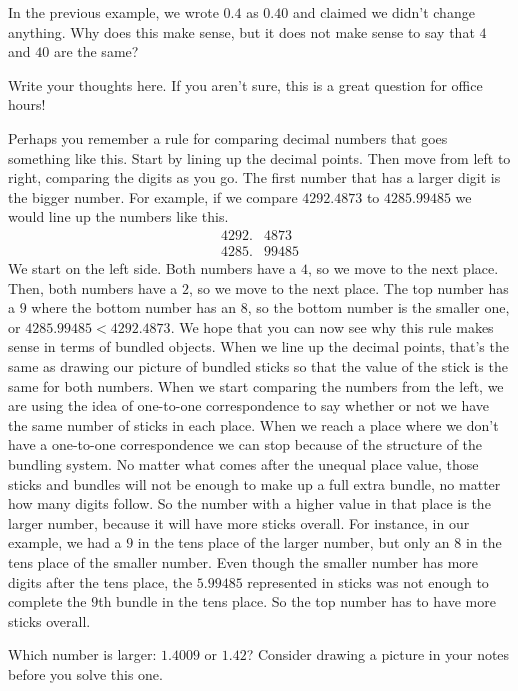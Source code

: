 \documentclass{ximera}
\begin{document}
\begin{question}
In the previous example, we wrote $0.4$ as $0.40$ and claimed we didn't change anything. Why does this make sense, but it does not make sense to say that $4$ and $40$ are the same?
\begin{freeResponse}
Write your thoughts here. If you aren't sure, this is a great question for office hours!
\end{freeResponse}
\end{question}

Perhaps you remember a rule for comparing decimal numbers that goes something like this. Start by lining up the decimal points. Then move from left to right, comparing the digits as you go. The first number that has a larger digit is the bigger number. For example, if we compare $4292.4873$ to $4285.99485$ we would line up the numbers like this.
\begin{align*}
4292.&4873\\
4285.&99485
\end{align*}
We start on the left side. Both numbers have a $4$, so we move to the next place. Then, both numbers have a $2$, so we move to the next place. The top number has a $9$ where the bottom number has an $8$, so the bottom number is the smaller one, or $4285.99485 < 4292.4873$. We hope that you can now see why this rule makes sense in terms of bundled objects. When we line up the decimal points, that's the same as drawing our picture of bundled sticks so that the value of the stick is the same for both numbers. When we start comparing the numbers from the left, we are using the idea of one-to-one correspondence to say whether or not we have the same number of sticks in each place. When we reach a place where we don't have a one-to-one correspondence we can stop because of the structure of the bundling system. No matter what comes after the unequal place value, those sticks and bundles will not be enough to make up a full extra bundle, no matter how many digits follow. So the number with a higher value in that place is the larger number, because it will have more sticks overall. For instance, in our example, we had a $9$ in the tens place of the larger number, but only an $8$ in the tens place of the smaller number. Even though the smaller number has more digits after the tens place, the $5.99485$ represented in sticks was not enough to complete the $9$th bundle in the tens place. So the top number has to have more sticks overall.

\begin{question}
Which number is larger: $1.4009$ or $1.42$? Consider drawing a picture in your notes before you solve this one.

\begin{multipleChoice}
\end{multipleChoice}
\end{question}
\end{document}
